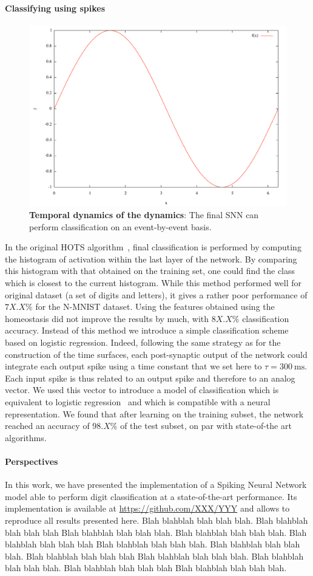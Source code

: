 \documentclass[12pt]{article}
\newcommand{\citep}[1]{\parencite{#1}}
\newcommand{\citet}[1]{\textcite{#1}}
\newcommand{\ms}{\si{\milli\second}}%
\begin{document}
\paragraph*{Classifying using spikes}
\begin{figure}[!ht]%
\includegraphics[width=.99\linewidth, height=.15\linewidth]{figure1.pdf}
\caption
{
\textbf{Temporal dynamics of the dynamics}: The final SNN can perform classification on an event-by-event basis. 
\label{fig:fig2}
}
\end{figure}
In the original HOTS algorithm~\citet{Lagorce17}, final classification is performed by computing the histogram of activation within the last layer of the network. By comparing this histogram with that obtained on the training set, one could find the class which is closest to the current histogram. While this method performed well for original dataset (a set of digits and letters), it gives a rather poor performance of $7X.X\%$ for the N-MNIST dataset. Using the features obtained using the homeostasis did not improve the results by much, with $8X.X\%$ classification accuracy. 
Instead of this method we introduce a simple classification scheme based on logistic regression. Indeed, following the same strategy as for the construction of the time surfaces, each post-synaptic output of the network could integrate each output spike using a time constant that we set here to $\tau=300~\ms$. Each input spike is thus related to an output spike and therefore to an analog vector. We used this vector to introduce a model of classification which is equivalent to logistic regression~\citep{Berens12} and which is compatible with a neural representation. We found that after learning on the training subset, the network reached an accuracy of $98.X\%$ of the test subset, on par with state-of-the art algorithms.
%
\paragraph*{Perspectives}
In this work, we have presented the implementation of a Spiking Neural Network model able to perform digit classification at a state-of-the-art performance. Its implementation is available at \url{https://github.com/XXX/YYY} and allows to reproduce all results presented here. %
Blah blahblah blah blah blah. Blah blahblah blah blah blah Blah blahblah blah blah blah.
Blah blahblah blah blah blah. Blah blahblah blah blah blah Blah blahblah blah blah blah.
Blah blahblah blah blah blah. Blah blahblah blah blah blah Blah blahblah blah blah blah.
Blah blahblah blah blah blah. Blah blahblah blah blah blah Blah blahblah blah blah blah.
%
\end{document}

